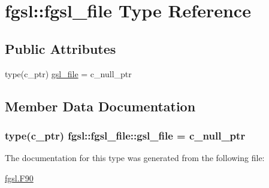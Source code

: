 \hypertarget{structfgsl_1_1fgsl__file}{\section{fgsl\-:\-:fgsl\-\_\-file Type Reference}
\label{structfgsl_1_1fgsl__file}
}
\subsection*{Public Attributes}
\begin{DoxyCompactItemize}
\item 
type(c\-\_\-ptr) \hyperlink{structfgsl_1_1fgsl__file_af456e8d82976ae4010ef4beb7573f13b}{gsl\-\_\-file} = c\-\_\-null\-\_\-ptr
\end{DoxyCompactItemize}


\subsection{Member Data Documentation}
\hypertarget{structfgsl_1_1fgsl__file_af456e8d82976ae4010ef4beb7573f13b}{
\subsubsection[{gsl\-\_\-file}]{\setlength{\rightskip}{0pt plus 5cm}type(c\-\_\-ptr) fgsl\-::fgsl\-\_\-file\-::gsl\-\_\-file = c\-\_\-null\-\_\-ptr}}\label{structfgsl_1_1fgsl__file_af456e8d82976ae4010ef4beb7573f13b}


The documentation for this type was generated from the following file\-:\begin{DoxyCompactItemize}
\item 
\hyperlink{fgsl_8F90}{fgsl.\-F90}\end{DoxyCompactItemize}
